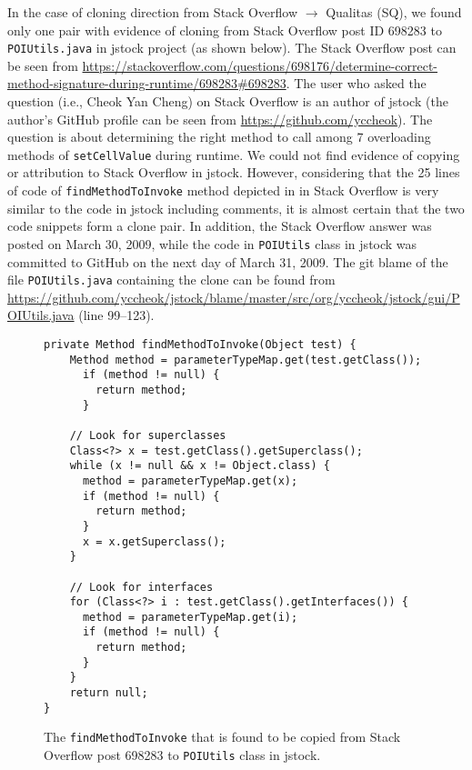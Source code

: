 \documentclass[a4paper,twoside,10pt]{reviewresponse}
\begin{document}
In the case of cloning direction from Stack Overflow $\rightarrow$ Qualitas
(SQ), we found only one pair with evidence of cloning from Stack Overflow post
ID 698283 to {\small\texttt{POIUtils.java}} in \textsf{jstock} project (as shown below). 
The Stack Overflow post can be seen from \url{https://stackoverflow.com/questions/698176/determine-correct-method-signature-during-runtime/698283#698283}.
The user who asked the question (i.e., Cheok Yan Cheng) on Stack Overflow is an author of \textsf{jstock} (the author's GitHub profile can be seen from \url{https://github.com/yccheok}). The
question is about determining the right method to call among 7 overloading
methods of {\small\texttt{setCellValue}} during runtime. We could not find
evidence of copying or attribution to Stack Overflow in \textsf{jstock}.
However, considering that the 25 lines of code of
{\small\texttt{findMethodToInvoke}} method depicted in  in Stack Overflow is
very similar to the code in \textsf{jstock} including comments, it is almost
certain that the two code snippets form a clone pair. In addition, the Stack
Overflow answer was posted on March 30, 2009, while the code in
{\small\texttt{POIUtils}} class in \textsf{jstock} was committed to GitHub on
the next day of March 31, 2009. 
The git blame of the file \texttt{POIUtils.java} 
containing the clone can be found from \url{https://github.com/yccheok/jstock/blame/master/src/org/yccheok/jstock/gui/POIUtils.java} (line 99--123).

\begin{figure}[H]
	\begin{lstlisting}
private Method findMethodToInvoke(Object test) {
	Method method = parameterTypeMap.get(test.getClass());
	  if (method != null) {
	    return method;
	  }
	
	// Look for superclasses
	Class<?> x = test.getClass().getSuperclass();
	while (x != null && x != Object.class) {
	  method = parameterTypeMap.get(x);
	  if (method != null) {
	    return method;
	  }
	  x = x.getSuperclass();
	}
	
	// Look for interfaces
	for (Class<?> i : test.getClass().getInterfaces()) {
	  method = parameterTypeMap.get(i);
	  if (method != null) {
	    return method;
	  }
	}
	return null;
}
	\end{lstlisting}
	\caption{The {\small\texttt{findMethodToInvoke}} that is found to be copied from Stack Overflow post 698283 to {\small\texttt{POIUtils}} class in \textsf{jstock}.}
	\label{fig:jstock_code}
\end{figure}
\end{document}
